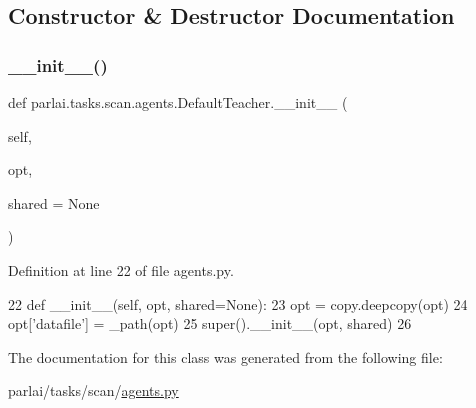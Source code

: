\subsection{Constructor \& Destructor Documentation}
\mbox{\label{classparlai_1_1tasks_1_1scan_1_1agents_1_1DefaultTeacher_a113f70356b142f1e9db8e80362287876}} 
\subsubsection{\texorpdfstring{\+\_\+\+\_\+init\+\_\+\+\_\+()}{\_\_init\_\_()}}
{\footnotesize\ttfamily def parlai.\+tasks.\+scan.\+agents.\+Default\+Teacher.\+\_\+\+\_\+init\+\_\+\+\_\+ (\begin{DoxyParamCaption}\item[{}]{self,  }\item[{}]{opt,  }\item[{}]{shared = {\ttfamily None} }\end{DoxyParamCaption})}



Definition at line 22 of file agents.\+py.


\begin{DoxyCode}
22     \textcolor{keyword}{def }\_\_init\_\_(self, opt, shared=None):
23         opt = copy.deepcopy(opt)
24         opt[\textcolor{stringliteral}{'datafile'}] = \_path(opt)
25         super().\_\_init\_\_(opt, shared)
26 \end{DoxyCode}


The documentation for this class was generated from the following file\+:\begin{DoxyCompactItemize}
\item 
parlai/tasks/scan/\hyperlink{parlai_2tasks_2scan_2agents_8py}{agents.\+py}\end{DoxyCompactItemize}

